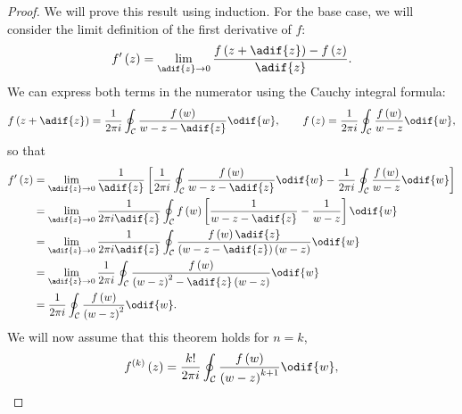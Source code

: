 \documentclass{article}
\begin{document}
\begin{proof}
    We will prove this result using induction. For the base case, we
    will consider the limit definition of the first derivative of \(f\):
    \begin{equation*}
        f'\left( z \right) = \lim_{\adif{z} \to 0} \frac{f\left( z + \adif{z} \right) - f\left( z \right)}{\adif{z}}.
    \end{equation*}
    We can express both terms in the numerator using the Cauchy integral
    formula:
    \begin{equation*}
        f\left( z + \adif{z} \right) = \frac{1}{2 \pi i} \oint_{\mathcal{C}} \frac{f\left( w \right)}{w - z - \adif{z}} \odif{w}, \qquad f\left( z \right) = \frac{1}{2 \pi i} \oint_{\mathcal{C}} \frac{f\left( w \right)}{w - z} \odif{w},
    \end{equation*}
    so that
    \begin{align*}
        f'\left( z \right) & = \lim_{\adif{z} \to 0} \frac{1}{\adif{z}} \left[ \frac{1}{2 \pi i} \oint_{\mathcal{C}} \frac{f\left( w \right)}{w - z - \adif{z}} \odif{w} - \frac{1}{2 \pi i} \oint_{\mathcal{C}} \frac{f\left( w \right)}{w - z} \odif{w} \right] \\
                           & = \lim_{\adif{z} \to 0} \frac{1}{2 \pi i \adif{z}} \oint_{\mathcal{C}} f\left( w \right) \left[ \frac{1}{w - z - \adif{z}} - \frac{1}{w - z} \right] \odif{w}                                                                        \\
                           & = \lim_{\adif{z} \to 0} \frac{1}{2 \pi i \adif{z}} \oint_{\mathcal{C}} \frac{f\left( w \right) \adif{z}}{\left( w - z - \adif{z} \right) \left( w - z \right)} \odif{w}                                                              \\
                           & = \lim_{\adif{z} \to 0} \frac{1}{2 \pi i} \oint_{\mathcal{C}} \frac{f\left( w \right)}{\left( w - z \right)^2 - \adif{z} \left( w - z \right)} \odif{w}                                                                              \\
                           & = \frac{1}{2 \pi i} \oint_{\mathcal{C}} \frac{f\left( w \right)}{\left( w - z \right)^2} \odif{w}.
    \end{align*}
    We will now assume that this theorem holds for \(n = k\),
    \begin{equation*}
        f^{\left( k \right)}\left( z \right) = \frac{k!}{2 \pi i} \oint_{\mathcal{C}} \frac{f\left( w \right)}{\left( w - z \right)^{k + 1}} \odif{w},

\end{equation*}
\end{proof}
\end{document}
